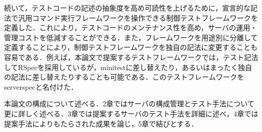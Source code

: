 続いて，テストコードの記述の抽象度を高め可読性を上げるために，宣言的な記法で汎用コマンド実行フレームワークを操作できる制御テストフレームワークを定義した．これにより，テストコードのメンテナンス性を高め，サーバの運用・管理コストを低減することができる．また，フレームワークを用途別に分離して定義することにより，制御テストフレームワークを独自の記法に変更することも容易である．例えば，本論文で提案するテストフレームワークでは，テスト記法してRSpec\cite{rspec}を採用しているが，minitest\cite{minitest}に差し替えたり，あるいはまったく独自の記法に差し替えたりすることも可能である．このテストフレームワークをserverspec\cite{serverspec}と名付けた．

本論文の構成について述べる．2章ではサーバの構成管理とテスト手法について更に詳しく述べる．3章では提案するサーバのテスト手法を詳細に述べ，4章では提案手法によりもたらされた成果を論じ，5章で結びとする．
